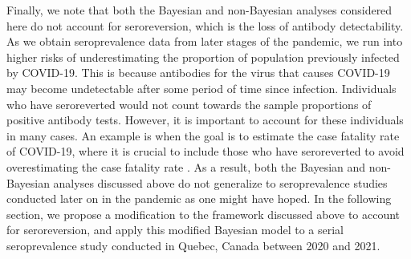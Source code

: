 Finally, we note that both the Bayesian and non-Bayesian analyses considered here do not account for seroreversion, which is the loss of antibody detectability. As we obtain seroprevalence data from later stages of the pandemic, we run into higher risks of underestimating the proportion of population previously infected by COVID-19. This is because antibodies for the virus that causes COVID-19 may become undetectable after some period of time since infection. Individuals who have seroreverted would not count towards the sample proportions of positive antibody tests. However, it is important to account for these individuals in many cases. An example is when the goal is to estimate the case fatality rate of COVID-19, where it is crucial to include those who have seroreverted to avoid overestimating the case fatality rate \citep{brazeau2022estimating}. As a result, both the Bayesian and non-Bayesian analyses discussed above do not generalize to seroprevalence studies conducted later on in the pandemic as one might have hoped. In the following section, we propose a modification to the framework discussed above to account for seroreversion, and apply this modified Bayesian model to a serial seroprevalence study conducted in Quebec, Canada between 2020 and 2021.